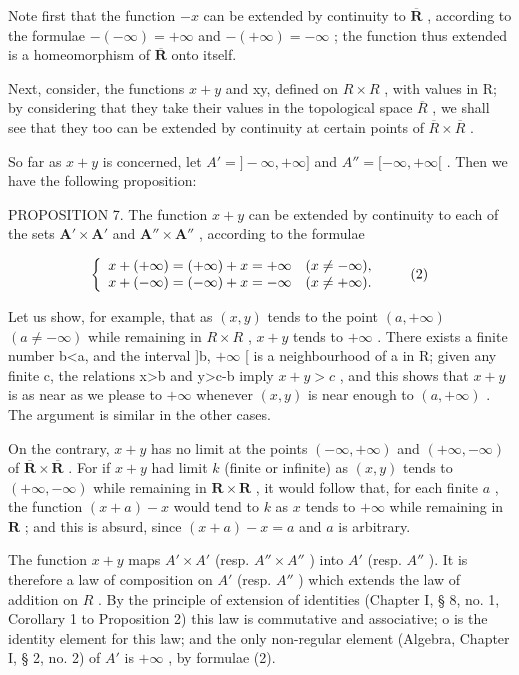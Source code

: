 Note first that the function \(-x\) can be extended by continuity to \(\overline{\mathbf{R}}\) , according to the formulae \(-(-\infty)=+\infty\) and \(-(+\infty)=-\infty\) ; the function thus extended is a homeomorphism of \(\overline{\mathbf{R}}\) onto itself.

Next, consider, the functions \(x + y\) and xy, defined on \(R \times R\) , with values in R; by considering that they take their values in the topological space \(\overline{R}\) , we shall see that they too can be extended by continuity at certain points of \(\overline{R} \times \overline{R}\) .

So far as \(x + y\) is concerned, let \(A' = ] - \infty, + \infty]\) and \(A'' = [-\infty, + \infty[\) . Then we have the following proposition:

PROPOSITION 7. The function \(x + y\) can be extended by continuity to each of the sets \(\mathbf{A}' \times \mathbf{A}'\) and \(\mathbf{A}'' \times \mathbf{A}''\) , according to the formulae

\[
\left\{ \begin{array}{l l} x + (+ \infty) = (+ \infty) + x = + \infty & (x \neq - \infty), \\ x + (- \infty) = (- \infty) + x = - \infty & (x \neq + \infty). \end{array} \right.\tag{2}
\]

Let us show, for example, that as \((x,y)\) tends to the point \((a,+\infty)\) \((a\neq-\infty)\) while remaining in \(R\times R\) , \(x+y\) tends to \(+\infty\) . There exists a finite number b\textless a, and the interval {]}b, \(+\infty\) {[} is a neighbourhood of a in R; given any finite c, the relations x\textgreater b and y\textgreater c-b imply \(x+y>c\) , and this shows that \(x+y\) is as near as we please to \(+\infty\) whenever \((x,y)\) is near enough to \((a,+\infty)\) . The argument is similar in the other cases.

On the contrary, \(x + y\) has no limit at the points \((-\infty, +\infty)\) and \((+\infty, -\infty)\) of \(\overline{\mathbf{R}} \times \overline{\mathbf{R}}\) . For if \(x + y\) had limit \(k\) (finite or infinite) as \((x, y)\) tends to \((+\infty, -\infty)\) while remaining in \(\mathbf{R} \times \mathbf{R}\) , it would follow that, for each finite \(a\) , the function \((x + a) - x\) would tend to \(k\) as \(x\) tends to \(+\infty\) while remaining in \(\mathbf{R}\) ; and this is absurd, since \((x + a) - x = a\) and \(a\) is arbitrary.

The function \(x + y\) maps \(A' \times A'\) (resp. \(A'' \times A''\) ) into \(A'\) (resp. \(A''\) ). It is therefore a law of composition on \(A'\) (resp. \(A''\) ) which extends the law of addition on \(R\) . By the principle of extension of identities (Chapter I, § 8, no. 1, Corollary 1 to Proposition 2) this law is commutative and associative; o is the identity element for this law; and the only non-regular element (Algebra, Chapter I, § 2, no. 2) of \(A'\) is \(+\infty\) , by formulae (2).


